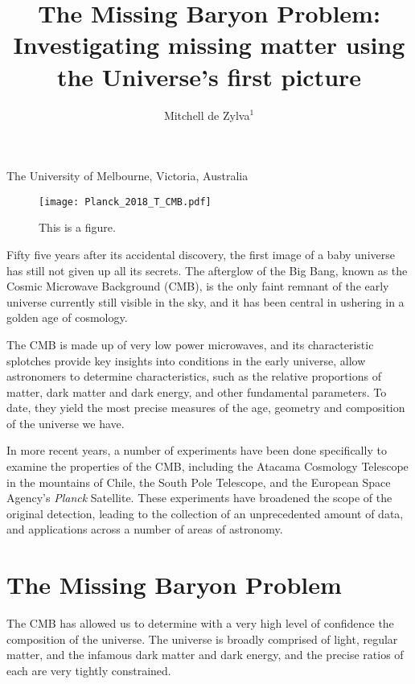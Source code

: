 \documentclass{nature}
\title{The Missing Baryon Problem: Investigating missing matter using the Universe's first picture}
\author{Mitchell de Zylva$^{1}$}
\begin{document}
\maketitle

\begin{affiliations}
 \item The University of Melbourne, Victoria, Australia
\end{affiliations}


\begin{figure}
    \begin{center}
        \texttt{[image: Planck\_2018\_T\_CMB.pdf]}
        \caption{This is a figure.}
    \end{center}
\end{figure}

Fifty five years after its accidental discovery, the first image of a baby universe has still not given up all its secrets. The afterglow of the Big Bang, known as the Cosmic Microwave Background (CMB), is the only faint remnant of the early universe currently still visible in the sky, and it has been central in ushering in a golden age of cosmology.  

The CMB is made up of very low power microwaves, and its characteristic splotches provide key insights into conditions in the early universe, allow astronomers to determine characteristics, such as the relative proportions of matter, dark matter and dark energy, and other fundamental parameters. To date, they yield the most precise measures of the age, geometry and composition of the universe we have. 

In more recent years, a number of experiments have been done specifically to examine the properties of the CMB, including the Atacama Cosmology Telescope in the mountains of Chile, the South Pole Telescope, and the European Space Agency's \textit{Planck} Satellite. These experiments have broadened the scope of the original detection, leading to the collection of an unprecedented amount of data, and applications across a number of areas of astronomy. 

\section{The Missing Baryon Problem}
The CMB has allowed us to determine with a very high level of confidence the composition of the universe. The universe is broadly comprised of light, regular matter, and the infamous dark matter and dark energy, and the precise ratios of each are very tightly constrained. 
\end{document}
